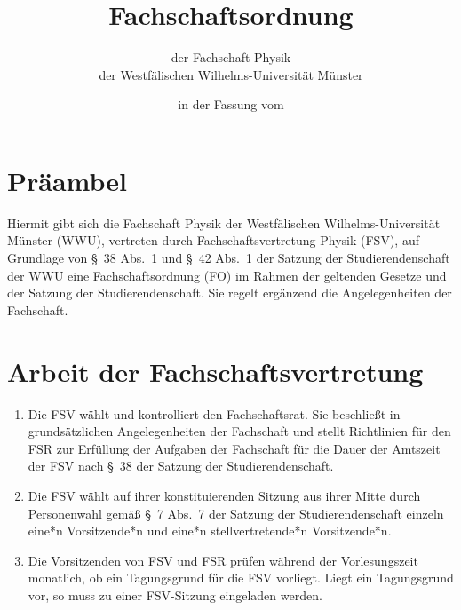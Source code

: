 


\pagestyle{scrheadings}

\title{Fachschaftsordnung}
\subtitle{der Fachschaft Physik\\
der Westfälischen Wilhelms-Universität Münster}
\date{in der Fassung vom }
\author{}



\maketitle

\section{Präambel}
Hiermit gibt sich die Fachschaft Physik der Westfälischen Wilhelms-Universität Münster (WWU), vertreten durch Fachschaftsvertretung Physik (FSV), auf Grundlage von §~38 Abs.~1 und §~42 Abs.~1 der Satzung der Studierendenschaft der WWU eine Fachschaftsordnung (FO) im Rahmen der geltenden Gesetze und der Satzung der Studierendenschaft.
Sie regelt ergänzend die Angelegenheiten der Fachschaft.

\section{Arbeit der Fachschaftsvertretung}
\begin{enumerate}
	\item Die FSV wählt und kontrolliert den Fachschaftsrat. Sie beschließt in grundsätzlichen Angelegenheiten der Fachschaft und stellt Richtlinien für den FSR zur Erfüllung der Aufgaben der Fachschaft für die Dauer	der Amtszeit der FSV nach §~38 der Satzung der Studierendenschaft.
	\item Die FSV wählt auf ihrer konstituierenden Sitzung aus ihrer Mitte durch Personenwahl gemäß §~7 Abs.~7 der Satzung der Studierendenschaft einzeln eine*n Vorsitzende*n und eine*n stellvertretende*n Vorsitzende*n.
	\item Die Vorsitzenden von FSV und FSR prüfen während der Vorlesungszeit monatlich, ob ein Tagungsgrund für die FSV vorliegt. Liegt ein Tagungsgrund vor, so muss zu einer FSV-Sitzung eingeladen werden.
\end{enumerate}


